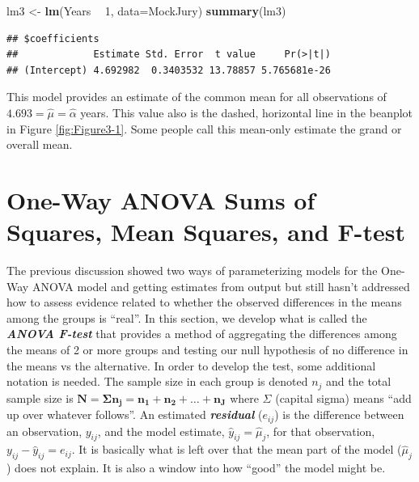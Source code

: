 \documentclass[]{book}
\newenvironment{Shaded}{\begin{snugshade}}{\end{snugshade}}
\newcommand{\KeywordTok}[1]{\textcolor[rgb]{0.13,0.29,0.53}{\textbf{#1}}}
\newcommand{\DataTypeTok}[1]{\textcolor[rgb]{0.13,0.29,0.53}{#1}}
\newcommand{\DecValTok}[1]{\textcolor[rgb]{0.00,0.00,0.81}{#1}}
\newcommand{\StringTok}[1]{\textcolor[rgb]{0.31,0.60,0.02}{#1}}
\newcommand{\OperatorTok}[1]{\textcolor[rgb]{0.81,0.36,0.00}{\textbf{#1}}}
\newcommand{\NormalTok}[1]{#1}
\begin{document}
\begin{Shaded}
\begin{Highlighting}[]
\NormalTok{lm3 <-}\StringTok{ }\KeywordTok{lm}\NormalTok{(Years }\OperatorTok{~}\StringTok{ }\DecValTok{1}\NormalTok{, }\DataTypeTok{data=}\NormalTok{MockJury)}
\KeywordTok{summary}\NormalTok{(lm3)}
\end{Highlighting}
\end{Shaded}

\begin{verbatim}
## $coefficients
##             Estimate Std. Error  t value     Pr(>|t|)
## (Intercept) 4.692982  0.3403532 13.78857 5.765681e-26
\end{verbatim}

This model provides an estimate of the common mean for all observations
of \(4.693 = \hat{\mu} = \hat{\alpha}\) years. This value also is the
dashed, horizontal line in the beanplot in Figure \ref{fig:Figure3-1}.
Some people call this mean-only estimate the grand or overall mean.

\section{One-Way ANOVA Sums of Squares, Mean Squares, and
F-test}\label{section3-3}

The previous discussion showed two ways of parameterizing models for the
One-Way ANOVA model and getting estimates from output but still hasn't
addressed how to assess evidence related to whether the observed
differences in the means among the groups is ``real''. In this section,
we develop what is called the \textbf{\emph{ANOVA F-test}} that provides
a method of aggregating the differences among the means of 2 or more
groups and testing our null hypothesis of no difference in the means vs
the alternative. In order to develop the test, some additional notation
is needed. The sample size in each group is denoted \(n_j\) and the
total sample size is
\(\boldsymbol{N=\Sigma n_j = n_1 + n_2 + \ldots + n_J}\) where
\(\Sigma\) (capital sigma) means ``add up over whatever follows''. An
estimated \textbf{\emph{residual}} (\(e_{ij}\)) is the difference
between an observation, \(y_{ij}\), and the model estimate,
\(\hat{y}_{ij} = \hat{\mu}_j\), for that observation,
\(y_{ij}-\hat{y}_{ij} = e_{ij}\). It is basically what is left over that
the mean part of the model (\(\hat{\mu}_{j}\)) does not explain. It is
also a window into how ``good'' the model might be.
\end{document}
